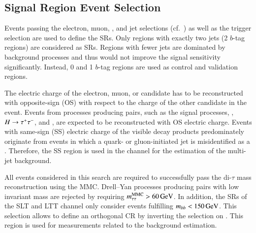 



\subsection{Signal Region Event Selection}%
\label{sec:sr_and_cr_selection}

Events passing the electron, muon, \tauhadvis, and jet selections
(cf.~) as well as the trigger selection are used to
define the SRs. Only regions with exactly two \btagged jets (2 $b$-tag regions)
are considered as SRs. Regions with fewer \btagged jets are dominated by
background processes and thus would not improve the signal sensitivity
significantly. Instead, 0 and 1 $b$-tag regions are used as control and
validation regions.

The electric charge of the electron, muon, or \tauhadvis candidate has to be
reconstructed with opposite-sign (OS) with respect to the charge of the other
\tauhadvis candidate in the event. Events from processes producing \taulepton
pairs, such as the signal processes, \Zjets, $H \to \tau^{+} \tau^{-}$, and \ttbar, are
expected to be reconstructed with OS electric charge. Events with same-sign (SS)
electric charge of the visible \taulepton decay products predominately originate
from events in which a quark- or gluon-initiated jet is misidentified as a
\tauhadvis. Therefore, the SS region is used in the \hadhad channel for the
estimation of the multi-jet background.

All events considered in this search are required to successfully pass the
di-$\tau$ mass reconstruction using the MMC. Drell--Yan processes producing
\taulepton pairs with low invariant mass are rejected by requiring
$m_{\tau\tau}^\text{MMC} > \SI{60}{\ensuremath{\text{GeV}}}$. In addition, the SRs of the \lephad SLT and LTT channel
only consider events fulfilling $m_{bb} < \SI{150}{\ensuremath{\text{GeV}}}$. This selection allows
to define an orthogonal \ttbar CR by inverting the selection on \mBB. This
region is used for measurements related to the \faketauhadvis background
estimation.

